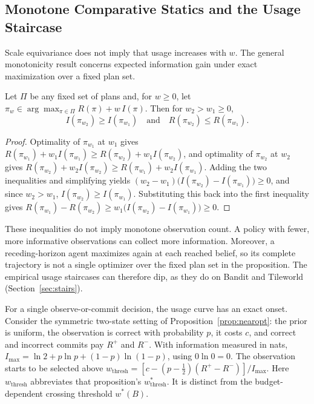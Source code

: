 \documentclass[manuscript, screen, review]{jair}
\begin{document}
\subsection{Monotone Comparative Statics and the Usage Staircase}
\label{sec:pi2}

Scale equivariance does not imply that usage increases with $w$. The general monotonicity result concerns expected information gain under exact maximization over a fixed plan set.

\begin{proposition}
\label{prop:pi2}
Let $\Pi$ be any fixed set of plans and, for $w \ge 0$, let $\pi_w \in \arg\max_{\pi \in \Pi} R(\pi) + w\, I(\pi)$. Then for $w_2 > w_1 \ge 0$,
\begin{equation}
I(\pi_{w_2}) \ge I(\pi_{w_1}) \quad \text{and} \quad R(\pi_{w_2}) \le R(\pi_{w_1}).
\end{equation}
\end{proposition}
\begin{proof}
Optimality of $\pi_{w_1}$ at $w_1$ gives $R(\pi_{w_1}) + w_1 I(\pi_{w_1}) \ge R(\pi_{w_2}) + w_1 I(\pi_{w_2})$, and optimality of $\pi_{w_2}$ at $w_2$ gives $R(\pi_{w_2}) + w_2 I(\pi_{w_2}) \ge R(\pi_{w_1}) + w_2 I(\pi_{w_1})$. Adding the two inequalities and simplifying yields $(w_2 - w_1)\big(I(\pi_{w_2}) - I(\pi_{w_1})\big) \ge 0$, and since $w_2 > w_1$, $I(\pi_{w_2}) \ge I(\pi_{w_1})$. Substituting this back into the first inequality gives $R(\pi_{w_1}) - R(\pi_{w_2}) \ge w_1\big(I(\pi_{w_2}) - I(\pi_{w_1})\big) \ge 0$.
\end{proof}

These inequalities do not imply monotone observation count. A policy with fewer, more informative observations can collect more information. Moreover, a receding-horizon agent maximizes again at each reached belief, so its complete trajectory is not a single optimizer over the fixed plan set in the proposition. The empirical usage staircases can therefore dip, as they do on Bandit and Tileworld (Section~\ref{sec:stairs}).

For a single observe-or-commit decision, the usage curve has an exact onset. Consider the symmetric two-state setting of Proposition~\ref{prop:nearopt}: the prior is uniform, the observation is correct with probability $p$, it costs $c$, and correct and incorrect commits pay $R^+$ and $R^-$. With information measured in nats, $I_{\max}=\ln 2+p\ln p+(1-p)\ln(1-p)$, using $0\ln0=0$. The observation starts to be selected above $w_{\mathrm{thresh}}=[c-(p-\tfrac12)(R^+-R^-)]/I_{\max}$. Here $w_{\mathrm{thresh}}$ abbreviates that proposition's $w^*_{\mathrm{thresh}}$. It is distinct from the budget-dependent crossing threshold $w^*(B)$.
\end{document}
